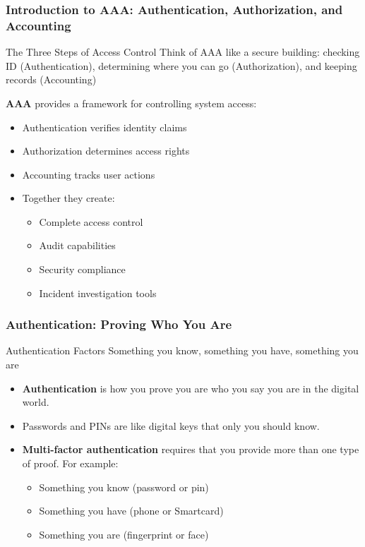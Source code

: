 \documentclass{beamer}
\begin{document}
\begin{frame}
    \frametitle{Introduction to AAA: Authentication, Authorization, and Accounting}
    \begin{block}{The Three Steps of Access Control}
        Think of AAA like a secure building: checking ID (Authentication), determining where you can go (Authorization), and keeping records (Accounting)
    \end{block}
    
    \textbf{AAA} provides a framework for controlling system access:
    \begin{itemize}
        \item Authentication verifies identity claims
        \item Authorization determines access rights
        \item Accounting tracks user actions
        \item Together they create:
          \begin{itemize}
            \item Complete access control
            \item Audit capabilities
            \item Security compliance
            \item Incident investigation tools
          \end{itemize}
    \end{itemize}
\end{frame}

\begin{frame}
    \frametitle{Authentication: Proving Who You Are}
    \begin{block}{Authentication Factors}
        Something you know, something you have, something you are
    \end{block}
    \begin{itemize}
        \item \textbf{Authentication} is how you prove you are who you say you are in the digital world.
        \item Passwords and PINs are like digital keys that only you should know.
        \item \textbf{Multi-factor authentication} requires that you provide more than one type of proof. For example:
          \begin{itemize}
            \item Something you know (password or pin)
            \item Something you have (phone or Smartcard)
            \item Something you are (fingerprint or face)
          \end{itemize}
    \end{itemize}
\end{frame}
\end{document}
